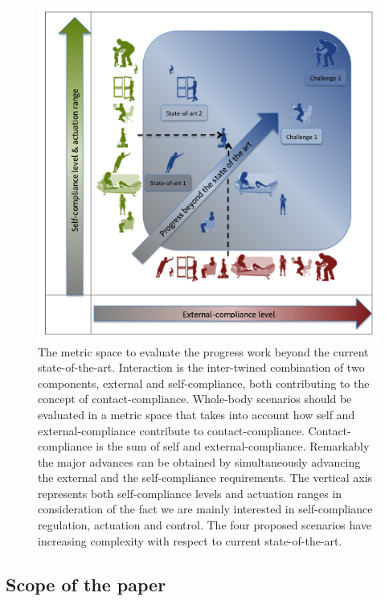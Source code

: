 \documentclass[final,5p,twocolumn]{elsarticle}
\begin{document}
\begin{figure}[!ht]
\centering
\includegraphics[width=\linewidth]{./images/classification3.png}
\caption{The metric space to evaluate the progress work beyond the current state-of-the-art. Interaction is the inter-twined combination of two components, external and self-compliance, both contributing to the concept of contact-compliance. Whole-body scenarios should be evaluated in a metric space that takes into account how self and external-compliance contribute to contact-compliance. Contact-compliance is the sum of self and external-compliance. Remarkably the major advances can be obtained by simultaneously advancing the external and the self-compliance requirements. The vertical axis represents both self-compliance levels and actuation ranges in consideration of the fact we are mainly interested in self-compliance regulation, actuation and control. The four proposed scenarios have increasing complexity with respect to current state-of-the-art. }
\label{fig:classification3}
\end{figure}


\subsection{Scope of the paper}
\end{document}
